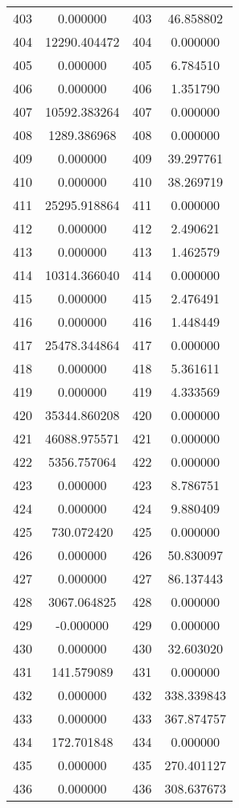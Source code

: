 \documentclass[12pt]{article}
\begin{document}
\begin{longtable}{@{}cccc@{}}
403 & 0.000000 & 403 & 46.858802 \\
404 & 12290.404472 & 404 & 0.000000 \\
405 & 0.000000 & 405 & 6.784510 \\
406 & 0.000000 & 406 & 1.351790 \\
407 & 10592.383264 & 407 & 0.000000 \\
408 & 1289.386968 & 408 & 0.000000 \\
409 & 0.000000 & 409 & 39.297761 \\
410 & 0.000000 & 410 & 38.269719 \\
411 & 25295.918864 & 411 & 0.000000 \\
412 & 0.000000 & 412 & 2.490621 \\
413 & 0.000000 & 413 & 1.462579 \\
414 & 10314.366040 & 414 & 0.000000 \\
415 & 0.000000 & 415 & 2.476491 \\
416 & 0.000000 & 416 & 1.448449 \\
417 & 25478.344864 & 417 & 0.000000 \\
418 & 0.000000 & 418 & 5.361611 \\
419 & 0.000000 & 419 & 4.333569 \\
420 & 35344.860208 & 420 & 0.000000 \\
421 & 46088.975571 & 421 & 0.000000 \\
422 & 5356.757064 & 422 & 0.000000 \\
423 & 0.000000 & 423 & 8.786751 \\
424 & 0.000000 & 424 & 9.880409 \\
425 & 730.072420 & 425 & 0.000000 \\
426 & 0.000000 & 426 & 50.830097 \\
427 & 0.000000 & 427 & 86.137443 \\
428 & 3067.064825 & 428 & 0.000000 \\
429 & -0.000000 & 429 & 0.000000 \\
430 & 0.000000 & 430 & 32.603020 \\
431 & 141.579089 & 431 & 0.000000 \\
432 & 0.000000 & 432 & 338.339843 \\
433 & 0.000000 & 433 & 367.874757 \\
434 & 172.701848 & 434 & 0.000000 \\
435 & 0.000000 & 435 & 270.401127 \\
436 & 0.000000 & 436 & 308.637673 \\

\end{longtable}
\end{document}

